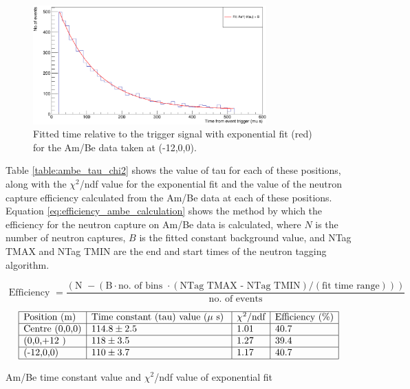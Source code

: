 \begin{figure}
    \centering
    \includegraphics[width=0.8\textwidth]{Figures/ambe_data_-12x.png}
    \caption{Fitted time relative to the trigger signal with exponential fit (red) for the Am/Be data taken at (-12,0,0).}
    \label{fig:ambe_-12}
\end{figure}

Table \ref{table:ambe_tau_chi2} shows the value of tau for each of these positions, along with the $\chi^{2}$/ndf value for the exponential fit and the value of the neutron capture efficiency calculated from the Am/Be data at each of these positions. Equation \ref{eq:efficiency_ambe_calculation} shows the method by which the efficiency for the neutron capture on Am/Be data is calculated, where $N$ is the number of neutron captures, $B$ is the fitted constant background value, and NTag TMAX and NTag TMIN are the end and start times of the neutron tagging algorithm.  



\begin{equation}
    \text { Efficiency }=\frac{(\text {N } - (\text{B} \cdot \text {no. of bins }  \cdot (\text{NTag TMAX - NTag TMIN}) / (\text{fit time range})))  }{\text { no. of events }}
    \label{eq:efficiency_ambe_calculation}
\end{equation}

\begin{table}
    $$
    \begin{array}{|l|l|l|l|l|}
    \hline \text{Position (m)} & \text {Time constant (tau) value ($\mu$ s) } & \text{$\chi^{2}$/ndf} & \text{Efficiency (\%)} \\
    \hline \text{Centre (0,0,0)} & 114.8 \pm 2.5  & 1.01 & 40.7 \\
    \hline \text{(0,0,+12 )} & 118 \pm 3.5 & 1.27 & 39.4 \\
    \hline \text{(-12,0,0)} & 110 \pm 3.7 & 1.17 & 40.7 \\
    \hline
    \end{array}
    $$
    \caption{Am/Be time constant value and $\chi^{2}$/ndf value of exponential fit}
    \label{table:ambe_tau_chi2}
\end{table}

